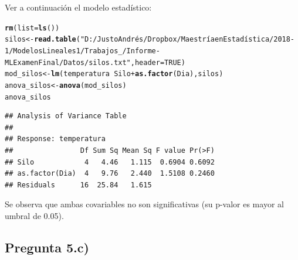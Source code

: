 \documentclass[10pt,a4paper]{article}\usepackage[]{graphicx}\usepackage[]{color}
\makeatletter
\newcommand{\hlnum}[1]{\textcolor[rgb]{0.686,0.059,0.569}{#1}}%
\newcommand{\hlstr}[1]{\textcolor[rgb]{0.192,0.494,0.8}{#1}}%
\newcommand{\hlopt}[1]{\textcolor[rgb]{0,0,0}{#1}}%
\newcommand{\hlstd}[1]{\textcolor[rgb]{0.345,0.345,0.345}{#1}}%
\newcommand{\hlkwb}[1]{\textcolor[rgb]{0.69,0.353,0.396}{#1}}%
\newcommand{\hlkwc}[1]{\textcolor[rgb]{0.333,0.667,0.333}{#1}}%
\newcommand{\hlkwd}[1]{\textcolor[rgb]{0.737,0.353,0.396}{\textbf{#1}}}%
\newenvironment{kframe}{%
 \def\at@end@of@kframe{}%
 \ifinner\ifhmode%
  \def\at@end@of@kframe{\end{minipage}}%
  \begin{minipage}{\columnwidth}%
 \fi\fi%
 \def\FrameCommand##1{\hskip\@totalleftmargin \hskip-\fboxsep
 \colorbox{shadecolor}{##1}\hskip-\fboxsep
     \hskip-\linewidth \hskip-\@totalleftmargin \hskip\columnwidth}%
 \MakeFramed {\advance\hsize-\width
   \@totalleftmargin\z@ \linewidth\hsize
   \@setminipage}}%
 {\par\unskip\endMakeFramed%
 \at@end@of@kframe}
\newenvironment{knitrout}{}{} %
\makeatother
\begin{document}
Ver a continuación el modelo estadístico:
\begin{knitrout}\small
{}\color{fgcolor}\begin{kframe}
\begin{alltt}
\hlkwd{rm}\hlstd{(}\hlkwc{list}\hlstd{=}\hlkwd{ls}\hlstd{())}
\hlstd{silos} \hlkwb{<-} \hlkwd{read.table}\hlstd{(}\hlstr{"D:/Justo Andrés/Dropbox/Maestría en Estadística/2018 - 1/Modelos Lineales 1/Trabajos_/Informe - ML Examen Final/Datos/silos.txt"}\hlstd{,}\hlkwc{header}\hlstd{=}\hlnum{TRUE}\hlstd{)}
\hlstd{mod_silos}\hlkwb{<-}\hlkwd{lm}\hlstd{(temperatura}\hlopt{~}\hlstd{Silo}\hlopt{+}\hlkwd{as.factor}\hlstd{(Dia),silos)}
\hlstd{anova_silos}\hlkwb{<-}\hlkwd{anova}\hlstd{(mod_silos)}
\hlstd{anova_silos}
\end{alltt}
\begin{verbatim}
## Analysis of Variance Table
## 
## Response: temperatura
##                Df Sum Sq Mean Sq F value Pr(>F)
## Silo            4   4.46   1.115  0.6904 0.6092
## as.factor(Dia)  4   9.76   2.440  1.5108 0.2460
## Residuals      16  25.84   1.615
\end{verbatim}
\end{kframe}
\end{knitrout}

Se observa que ambas covariables no son significativas (su p-valor es mayor al umbral de 0.05).

\subsection{Pregunta 5.c)}
\end{document}
